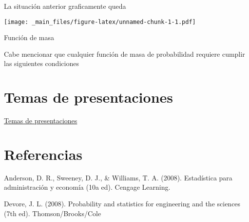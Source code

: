 \documentclass[
]{book}
\begin{document}
La situación anterior graficamente queda

\texttt{[image: \_main\_files/figure-latex/unnamed-chunk-1-1.pdf]}

Función de masa

Cabe mencionar que cualquier función de masa de probabilidad requiere cumplir las siguientes condiciones

\hypertarget{temas-de-presentaciones}{%
\chapter{Temas de presentaciones}\label{temas-de-presentaciones}}

\href{https://correouss-my.sharepoint.com/:f:/r/personal/imaldonadoc1_docente_uss_cl/Documents/doc/temas?csf=1\&web=1}{Temas de presentaciones}

\hypertarget{referencias}{%
\chapter*{Referencias}\label{referencias}}

Anderson, D. R., Sweeney, D. J., \& Williams, T. A. (2008). Estadística para administración y economía (10a ed). Cengage Learning.

Devore, J. L. (2008). Probability and statistics for engineering and the sciences (7th ed). Thomson/Brooks/Cole

  
\end{document}
